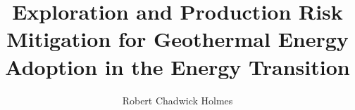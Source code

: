 % 
% 
%
%
%
%
%
%
%
%
% 
% 

\title{Exploration and Production Risk Mitigation for Geothermal Energy Adoption in the Energy Transition}

\author{Robert Chadwick Holmes}


